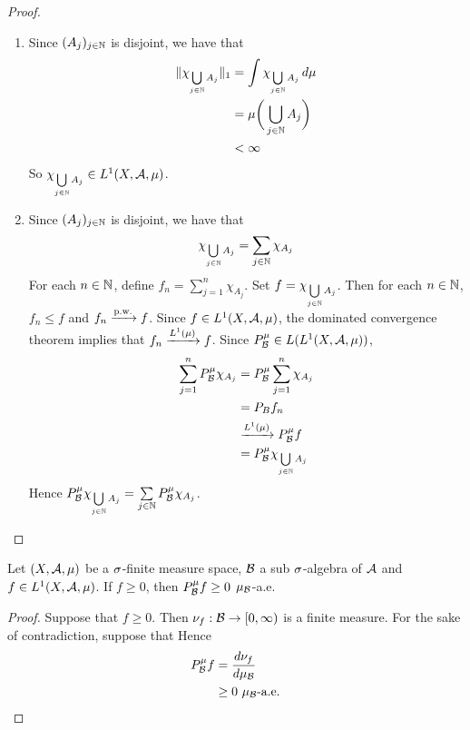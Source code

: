 \documentclass{book}
\begin{document}
	\begin{proof}\
		\begin{enumerate}
			\item Since $(A_j)_{j \in \mathbb{N}}$ is disjoint, we have that 
			\begin{align*}
				\|\chi_{\bigcup\limits_{j \in \mathbb{N}} A_j}\|_1 
				& = \int \chi_{\bigcup\limits_{j \in \mathbb{N}} A_j} \, d \mu \\
				& = \mu\bigg(\bigcup\limits_{j \in \mathbb{N}} A_j \bigg) \\
				& < \infty
			\end{align*}
			So $\chi_{\bigcup\limits_{j \in \mathbb{N}} A_j} \in L^1(X, \mathcal{A}, \mu)$.
			\item Since  $(A_j)_{j \in \mathbb{N}}$ is disjoint, we have that 
			$$\chi_{\bigcup\limits_{j \in \mathbb{N}} A_j} = \sum\limits_{j \in \mathbb{N}} \chi_{A_j}$$
			For each $n \in \mathbb{N}$, define $f_n = \sum\limits_{j = 1}^n \chi_{A_j}$. Set $f = \chi_{\bigcup\limits_{j \in \mathbb{N}} A_j}$. Then for each $n \in \mathbb{N}$, $f_n \leq f$ and $f_n \xrightarrow{\text{p.w.}} f$. Since $f \in L^1(X, \mathcal{A}, \mu)$, the dominated convergence theorem implies that $f_n \xrightarrow{L^1(\mu)} f$. Since $P^{\mu}_{\mathcal{B}} \in L(L^1(X, \mathcal{A}, \mu))$, 
			\begin{align*}
				\sum\limits_{j=1}^n P^{\mu}_{\mathcal{B}} \chi_{A_j}
				& = P^{\mu}_{\mathcal{B}} \sum\limits_{j=1}^n \chi_{A_j} \\
				& = P_{B}f_n \\
				& \xrightarrow{L^1(\mu)} P^{\mu}_{\mathcal{B}}f \\
				& = P^{\mu}_{\mathcal{B}} \chi_{\bigcup\limits_{j \in \mathbb{N}} A_j} 
			\end{align*}  
			Hence  $P^{\mu}_{\mathcal{B}} \chi_{\bigcup\limits_{j \in \mathbb{N}} A_j} = \sum\limits_{j \in \mathbb{N}} P^{\mu}_{\mathcal{B}}\chi_{A_j}$.
		\end{enumerate}
	\end{proof}

	\begin{ex}
		Let $(X, \mathcal{A}, \mu)$ be a $\sigma$-finite measure space, $\mathcal{B}$ a sub $\sigma$-algebra of $\mathcal{A}$ and $f \in L^1(X, \mathcal{A}, \mu)$. If $f \geq 0$, then $P^{\mu}_{\mathcal{B}}f \geq 0$ $\mu_{\mathcal{B}}$-a.e.
	\end{ex}

	\begin{proof}
		Suppose that $f \geq 0$. Then $\nu_f: \mathcal{B} \rightarrow [0, \infty)$ is a finite measure. For the sake of contradiction, suppose that Hence 
		\begin{align*}
			P^{\mu}_{\mathcal{B}}f 
			& = \frac{d \nu_f}{d \mu_{\mathcal{B}}} \\
			& \geq 0 \text{ $\mu_{\mathcal{B}}$-a.e.}
		\end{align*}
	\end{proof}
\end{document}
